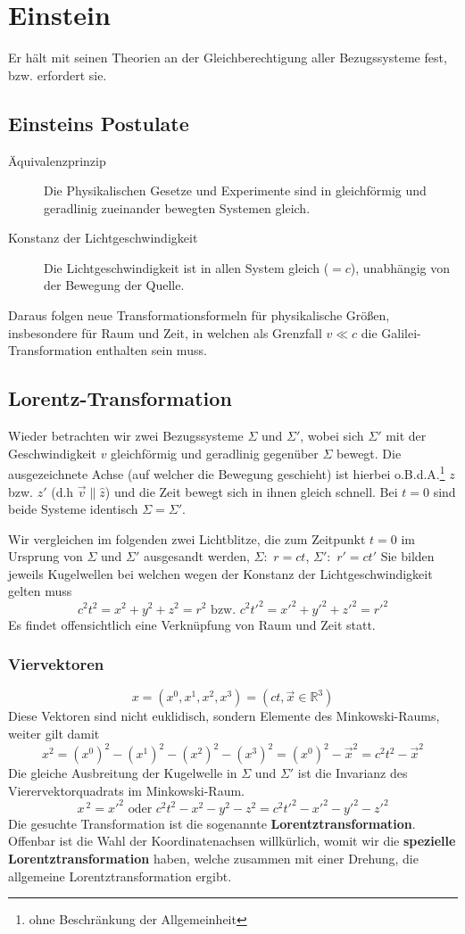 \documentclass[oneside]{book}
\theoremstyle{definition}
\renewcommand{\Re}{\mathbb{R}}
\begin{document}
\section{Einstein}
Er hält mit seinen Theorien an der Gleichberechtigung aller Bezugssysteme fest, bzw. erfordert sie.

\subsection{Einsteins Postulate}
\begin{description}
	\item[Äquivalenzprinzip] Die Physikalischen Gesetze und Experimente sind in gleichförmig und geradlinig zueinander bewegten Systemen gleich.
	\item[Konstanz der Lichtgeschwindigkeit] Die Lichtgeschwindigkeit ist in allen System gleich ($=c$), unabhängig von der Bewegung der Quelle. 
\end{description}
Daraus folgen neue Transformationsformeln für physikalische Größen, insbesondere für Raum und Zeit, in welchen als Grenzfall $v \ll c$ die Galilei-Transformation enthalten sein muss.

\subsection{Lorentz-Transformation}
Wieder betrachten wir zwei Bezugssysteme $\Sigma$ und $\Sigma'$, wobei sich $\Sigma'$ mit der Geschwindigkeit $v$ gleichförmig und geradlinig gegenüber $\Sigma$ bewegt. Die ausgezeichnete Achse (auf welcher die Bewegung geschieht) ist hierbei o.B.d.A.\footnote{ohne Beschränkung der Allgemeinheit} $z$ bzw. $z'$ (d.h $\vec{v} \parallel \hat{z}$) und die Zeit bewegt sich in ihnen gleich schnell. Bei $t = 0$ sind beide Systeme identisch $\Sigma = \Sigma'$.

Wir vergleichen im folgenden zwei Lichtblitze, die zum Zeitpunkt $t=0$ im Ursprung von $\Sigma$ und $\Sigma'$ ausgesandt werden, $\Sigma:$ $r = ct$, $\Sigma':$ $r' = c t'$ Sie bilden jeweils Kugelwellen bei welchen wegen der Konstanz der Lichtgeschwindigkeit gelten muss 
$$c^2 t^2 = x^2 + y^2 + z^2 = r^2 \text{~bzw.~} c^2t'^2 = x'^2 + y'^2 + z'^2 = r'^2$$
Es findet offensichtlich eine Verknüpfung von Raum und Zeit statt.

\subsubsection{Viervektoren}
$$x = (x^0, x^1, x^2, x^3) = (ct, \vec{x}\in\Re^3)$$
Diese Vektoren sind nicht euklidisch, sondern Elemente des Minkowski-Raums, weiter gilt damit
$$x^2 = (x^0)^2 - (x^1)^2 - (x^2)^2 - (x^3)^2 = (x^0)^2 - \vec{x}^2 = c^2t^2 - \vec{x}^2$$
Die gleiche Ausbreitung der Kugelwelle in $\Sigma$ und $\Sigma'$ ist die Invarianz des Vierervektorquadrats im Minkowski-Raum.
$$x^{~2} = x'^2 \text{~oder~} c^2 t^2 - x^2 - y^2 - z^2 = c^2 t'^2 - x'^2 - y'^2 - z'^2$$
Die gesuchte Transformation ist die sogenannte \textbf{Lorentztransformation}. Offenbar ist die Wahl der Koordinatenachsen willkürlich, womit wir die \textbf{spezielle Lorentztransformation} haben, welche zusammen mit einer Drehung, die allgemeine Lorentztransformation ergibt.
\end{document}
